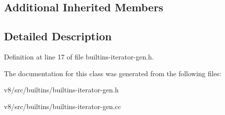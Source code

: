 \subsection*{Additional Inherited Members}


\subsection{Detailed Description}


Definition at line 17 of file builtins-\/iterator-\/gen.\+h.



The documentation for this class was generated from the following files\+:\begin{DoxyCompactItemize}
\item 
v8/src/builtins/builtins-\/iterator-\/gen.\+h\item 
v8/src/builtins/builtins-\/iterator-\/gen.\+cc\end{DoxyCompactItemize}
